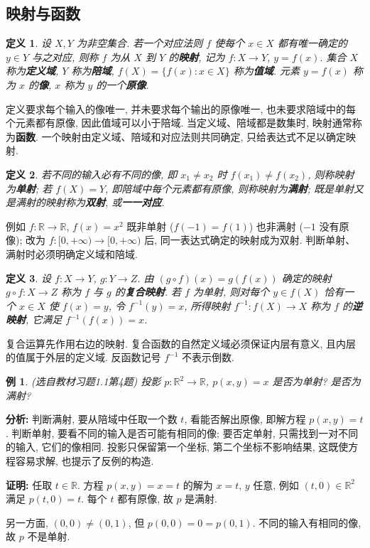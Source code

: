 \documentclass[UTF8,openany]{ctexbook}
\theoremstyle{chinesetextbook}
\newtheorem{definition}{定义}[section]
\newtheorem{example}{例}[section]
\newenvironment{cnproof}{\par\indent\textbf{证明:} \ignorespaces}{\par}
\begin{document}
\subsection{映射与函数}
\begin{definition}
设 $X,Y$ 为非空集合. 若一个对应法则 $f$ 使每个 $x\in X$ 都有唯一确定的 $y\in Y$ 与之对应, 则称 $f$ 为从 $X$ 到 $Y$ 的\textbf{映射}, 记为 $f:X\to Y$, $y=f(x)$. 集合 $X$ 称为\textbf{定义域}, $Y$ 称为\textbf{陪域}, $f(X)=\{f(x):x\in X\}$ 称为\textbf{值域}. 元素 $y=f(x)$ 称为 $x$ 的\textbf{像}, $x$ 称为 $y$ 的一个\textbf{原像}.
\end{definition}
定义要求每个输入的像唯一, 并未要求每个输出的原像唯一, 也未要求陪域中的每个元素都有原像, 因此值域可以小于陪域. 当定义域、陪域都是数集时, 映射通常称为\textbf{函数}. 一个映射由定义域、陪域和对应法则共同确定, 只给表达式不足以确定映射.
\begin{definition}
若不同的输入必有不同的像, 即 $x_1\ne x_2$ 时 $f(x_1)\ne f(x_2)$, 则称映射为\textbf{单射}; 若 $f(X)=Y$, 即陪域中每个元素都有原像, 则称映射为\textbf{满射}; 既是单射又是满射的映射称为\textbf{双射}, 或\textbf{一一对应}.
\end{definition}
例如 $f:\mathbb R\to\mathbb R$, $f(x)=x^2$ 既非单射 ($f(-1)=f(1)$) 也非满射 ($-1$ 没有原像); 改为 $f:[0,+\infty)\to[0,+\infty)$ 后, 同一表达式确定的映射成为双射. 判断单射、满射时必须明确定义域和陪域.
\begin{definition}
设 $f:X\to Y$, $g:Y\to Z$. 由 $(g\circ f)(x)=g(f(x))$ 确定的映射 $g\circ f:X\to Z$ 称为 $f$ 与 $g$ 的\textbf{复合映射}. 若 $f$ 为单射, 则对每个 $y\in f(X)$ 恰有一个 $x\in X$ 使 $f(x)=y$, 令 $f^{-1}(y)=x$, 所得映射 $f^{-1}:f(X)\to X$ 称为 $f$ 的\textbf{逆映射}, 它满足 $f^{-1}(f(x))=x$.
\end{definition}
复合运算先作用右边的映射. 复合函数的自然定义域必须保证内层有意义, 且内层的值属于外层的定义域. 反函数记号 $f^{-1}$ 不表示倒数.
\begin{example}
\textnormal{(选自教材习题1.1第4题)} 投影 $p:\mathbb R^2\to\mathbb R$, $p(x,y)=x$ 是否为单射? 是否为满射?
\end{example}
\par\indent\textbf{分析:} 判断满射, 要从陪域中任取一个数 $t$, 看能否解出原像, 即解方程 $p(x,y)=t$. 判断单射, 要看不同的输入是否可能有相同的像; 要否定单射, 只需找到一对不同的输入, 它们的像相同. 投影只保留第一个坐标, 第二个坐标不影响结果, 这既使方程容易求解, 也提示了反例的构造.
\begin{cnproof}
任取 $t\in\mathbb R$. 方程 $p(x,y)=x=t$ 的解为 $x=t$, $y$ 任意, 例如 $(t,0)\in\mathbb R^2$ 满足 $p(t,0)=t$. 每个 $t$ 都有原像, 故 $p$ 是满射.

另一方面, $(0,0)\ne(0,1)$, 但 $p(0,0)=0=p(0,1)$. 不同的输入有相同的像, 故 $p$ 不是单射.
\end{cnproof}
\end{document}
